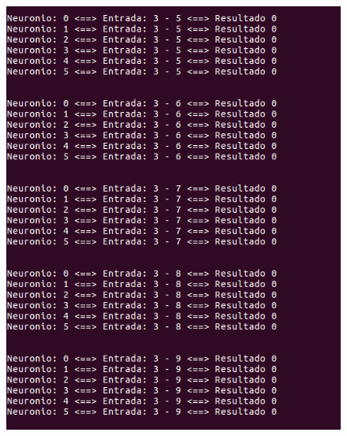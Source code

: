 \documentclass[hidelinks,12pt]{article}
\begin{document}
		\begin{figure}[!h]
			\centering
			\includegraphics[scale=0.5]{Figures/E3S3P2.png}
		\end{figure}
		
\end{document}
